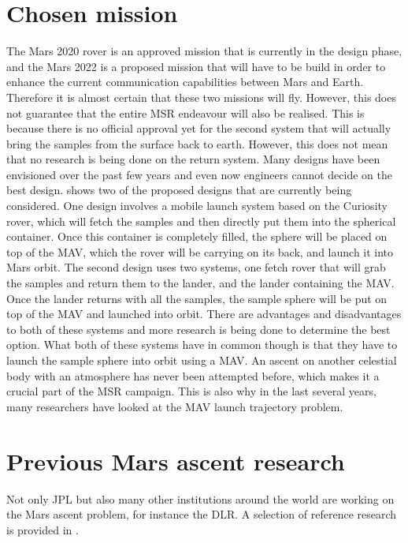 \section{Chosen mission}
\label{sec:chosenMission}
The Mars 2020 rover is an approved mission that is currently in the design phase, and the Mars 2022 is a proposed mission that will have to be build in order to enhance the current communication capabilities between Mars and Earth. Therefore it is almost certain that these two missions will fly. However, this does not guarantee that the entire \ac{MSR} endeavour will also be realised. This is because there is no official approval yet for the second system that will actually bring the samples from the surface back to earth. However, this does not mean that no research is being done on the return system. Many designs have been envisioned over the past few years and even now engineers cannot decide on the best design. \cite{shotwell2016drivers} shows two of the proposed designs that are currently being considered. One design involves a mobile launch system based on the Curiosity rover, which will fetch the samples and then directly put them into the spherical container. Once this container is completely filled, the sphere will be placed on top of the \ac{MAV}, which the rover will be carrying on its back, and launch it into Mars orbit. The second design uses two systems, one fetch rover that will grab the samples and return them to the lander, and the lander containing the \ac{MAV}. Once the lander returns with all the samples, the sample sphere will be put on top of the \ac{MAV} and launched into orbit. There are advantages and disadvantages to both of these systems and more research is being done to determine the best option. What both of these systems have in common though is that they have to launch the sample sphere into orbit using a \ac{MAV}. An ascent on another celestial body with an atmosphere has never been attempted before, which makes it a crucial part of the \ac{MSR} campaign. This is also why in the last several years, many researchers have looked at the \ac{MAV} launch trajectory problem. 


\section{Previous Mars ascent research}
\label{sec:previousMarsAscentResearch}
Not only \ac{JPL} but also many other institutions around the world are working on the Mars ascent problem, for instance the \ac{DLR}. A selection of reference research is provided in .

